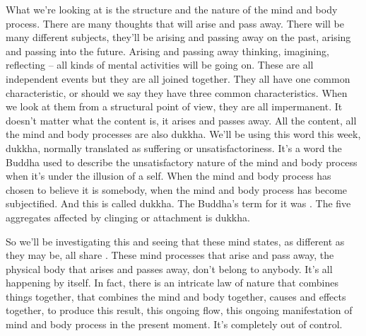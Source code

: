 \documentclass[letterpaper,10pt,english]{sphinxmanual}
\begin{document}
\sphinxAtStartPar
What we’re looking at is the structure and the nature of the mind and
body process. There are many thoughts that will arise and pass away. There
will be many different subjects, they’ll be arising and passing away on the
past, arising and passing into the future. Arising and passing away thinking,
imagining, reflecting – all kinds of mental activities will be going on. These
are  all  independent  events  but  they  are  all  joined  together.  They  all  have
one common characteristic, or should we say they have three common characteristics. When we look at them from a structural point of view, they are
all impermanent. It doesn’t matter what the content is, it arises and passes
away.  All  the  content,  all  the  mind  and  body  processes  are  also  dukkha.
We’ll be using this word this week, dukkha, normally translated as suffering
or unsatisfactoriness. It’s a word the Buddha used to describe the unsatisfactory nature of the mind and body process when it’s under the illusion of a
self. When the mind and body process has chosen to believe it is somebody,
when the mind and body process has become subjectified. And this is called
dukkha. The Buddha’s term for it was
.
The five aggregates affected by clinging or attachment is dukkha.

\sphinxAtStartPar
So we’ll be investigating this and seeing that these mind states, as different as they may be, all share
.  These
mind processes that arise and pass away, the physical body that arises and
passes away, don’t belong to anybody. It’s all happening by itself. In fact,
there is an intricate law of nature that combines things together, that combines  the  mind  and  body  together,  causes  and  effects  together,  to  produce
this result, this ongoing flow, this ongoing manifestation of mind and body
process in the present moment. It’s completely out of control.
\end{document}
